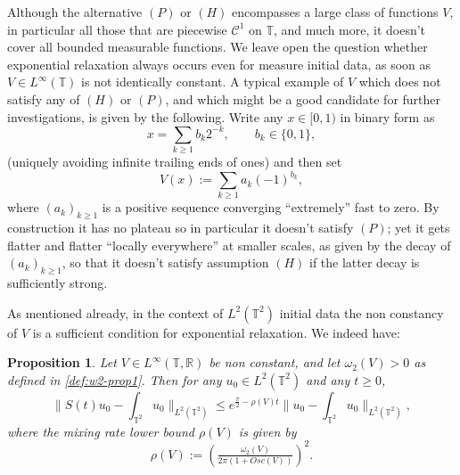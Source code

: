 \documentclass[12pt]{article}
\newtheorem{prop}{Proposition}
\newcommand{\R}{\mathbb{R}}
\newcommand{\T}{\mathbb{T}}
\begin{document}
Although the alternative $(P)$ or $(H)$ encompasses a large class of functions $V$, 
in particular all those that are piecewise $\mathcal{C}^1$ on $\T$, and much
more, it doesn't cover all bounded measurable functions.  
We leave open the question whether exponential relaxation always occurs  
even for measure initial data, as soon as $V \in L^\infty(\T)$ is not 
identically constant. 
A typical example of $V$ which does not satisfy any of $(H)$ or $(P)$, and which
might be a good candidate for further investigations, is given by the following. Write
any $x \in [0,1)$ in binary form as
$$
x = \sum_{k \geq 1} b_k 2^{-k}, \qquad b_k \in \{0, 1\},
$$
(uniquely avoiding infinite trailing ends of ones) and then set
$$
V(x) := \sum_{k \geq 1} a_k(-1)^{b_k},
$$
where $(a_k)_{k \geq 1}$ is a positive sequence converging ``extremely'' 
fast to zero. By construction it has no plateau so in particular it doesn't
satisfy $(P)$; yet it gets flatter and flatter ``locally everywhere'' at 
smaller scales, as given by the decay of $(a_k)_{k\geq 1}$,
so that it doesn't satisfy assumption $(H)$ if the latter 
decay is sufficiently strong. 

\medskip

As mentioned already, in the context of $L^2(\T^2)$ initial data
the non constancy of $V$ is a sufficient condition for 
exponential relaxation. We indeed have: 

\begin{prop}\label{prop:L2}
Let $V \in L^\infty(\T,\R)$ be non constant, and let $\omega_2(V) > 0$ as 
defined in \eqref{def:w2-prop1}. Then for any $u_0 \in L^2(\T^2)$ and any $t \geq 0$, 
\begin{equation}\label{eq:sgbound}
\big\|S(t)u_0 - \int_{\T^2}u_0\big\|_{L^2(\T^2)} \leq e^{\frac{\pi}{2} - \rho(V) t}
\big\|u_0 - \int_{\T^2}u_0\big\|_{L^2(\T^2)},
\end{equation}
where the mixing rate lower bound $\rho(V)$ is given by
\begin{equation}\label{eq:mixingcst}
\rho(V) := \left(\tfrac{\omega_2(V)}{2\pi(1 + Osc(V))}\right)^2.
\end{equation}
\end{prop}
\end{document}
